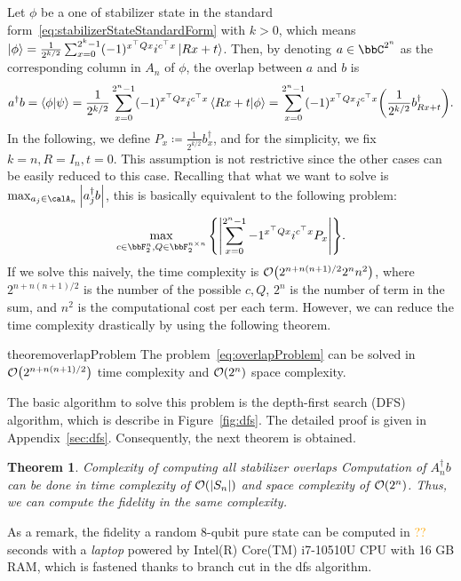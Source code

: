 \documentclass[a4paper, onecolumn, 11pt, longbibliography]{quantumarticle}
\newcommand{\orange}[1]{\textcolor{orange}{#1}}
\newcommand{\defeq}{\coloneqq}
\newtheorem{theorem}{Theorem}
\begin{document}
Let $\phi$ be a one of stabilizer state
in the standard form~\eqref{eq:stabilizerStateStandardForm}
with $k>0$, which means
$\ket{\phi} = \frac{1}{2^{k/2}}\sum_{x=0}^{2^k-1} (-1)^{x^\top Q x} i^{c^\top x} \ket{Rx+t}$.
Then, by denoting $a \in \bbC^{2^n}$ as the corresponding column in $A_n$ of $\phi$,
the overlap between $a$ and $b$ is
\begin{equation*}
  a^\dagger b
  = \braket{\phi}{\psi}
  = \frac{1}{2^{k/2}} \sum_{x=0}^{2^n-1} (-1)^{x^\top Q x} i^{c^\top x} \braket{Rx+t}{\phi}
  = \sum_{x=0}^{2^n-1} (-1)^{x^\top Q x} i^{c^\top x} \qty(\frac{1}{2^{k/2}}b_{Rx+t}^\dagger).
\end{equation*}
In the following, we define $P_x \defeq \frac{1}{2^{k/2}}b_x^\dagger$,
and for the simplicity, we fix $k=n,R=I_n,t=0$.
This assumption is not restrictive since
the other cases can be easily reduced to this case.
Recalling that what we want to solve
is $\max_{a_j \in \calA_n} \abs{a_j^\dagger b}$,
this is basically equivalent to the following problem:
\begin{equation}\label{eq:overlapProblem}
  \max_{c\in \bbF_2^{n},Q\in \bbF_2^{n \times n}} \qty{ \abs{\sum_{x=0}^{2^n-1} -1^{x^\top Q x} i^{c^\top x} P_x} }.
\end{equation}
If we solve this naively,
the time complexity is $\order{2^{n+n(n+1)/2} 2^n n^2}$,
where $2^{n+n(n+1)/2}$ is the number of the possible $c,Q$,
$2^n$ is the number of term in the sum,
and $n^2$ is the computational cost per each term.
However, we can reduce the time complexity drastically
by using the following theorem.
\begin{restatable}{theorem}{overlapProblem}
  \label{thm:overlapProblem}
  The problem~\eqref{eq:overlapProblem} can be solved
  in $\order{2^{n+n(n+1)/2}}$ time complexity and $\order{2^n}$ space complexity.
\end{restatable}
The basic algorithm to solve this problem
is the depth-first search (DFS) algorithm,
which is describe in Figure~\ref{fig:dfs}.
The detailed proof is given in Appendix~\ref{sec:dfs}.
Consequently, the next theorem is obtained.
\begin{theorem}{Complexity of computing all stabilizer overlaps}
  \label{thm:complexityStabilizerOverlap}
  Computation of $A_n^\dagger b$
  can be done in time complexity of
  $\order{\abs{S_n}}$ and
  space complexity of $\order{2^n}$.
  Thus, we can compute the fidelity
  in the same complexity.
\end{theorem}
As a remark,
the fidelity a random 8-qubit pure state can be computed
in \orange{??} seconds with a \textit{laptop} powered by Intel(R)
Core(TM) i7-10510U CPU with 16 GB RAM,
which is fastened
thanks to branch cut in the dfs algorithm.
\end{document}
